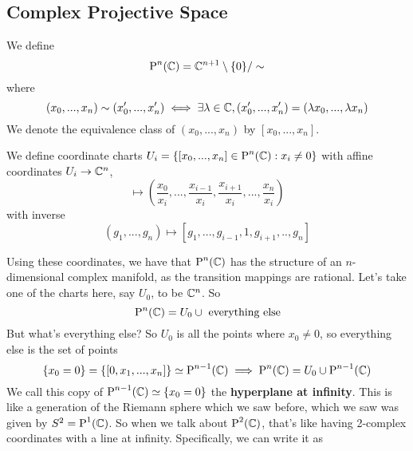 \documentclass{article}
\begin{document}
\subsection{Complex Projective Space}

\begin{definition}
We define
\begin{equation}
  \operatorname{P}^{n}({\mathbb{C}}) = \mathbb{C}^{n + 1} \setminus \{0\} / \sim
\end{equation}
where
\begin{equation}
  (x_0,...,x_n) \sim (x_0',...,x_n') \iff \exists \lambda \in \mathbb{C}, (x_0',...,x_n') = (\lambda x_0,..., \lambda x_n)
\end{equation}
We denote the equivalence class of \((x_0,...,x_n)\) by \([x_0,...,x_n]\).
\end{definition}
\begin{definition}
We define coordinate charts \(U_i = \{[x_0, ..., x_n] \in \operatorname{P}^{n}({\mathbb{C}}) : x_i \neq 0\}\) with affine coordinates \(U_i \to \mathbb{C}^n\),
\begin{equation}[x_0,...,x_n] \mapsto \left(\frac{x_0}{x_i},...,\frac{x_{i - 1}}{x_i}, \frac{x_{i + 1}}{x_i},...,\frac{x_n}{x_i}\right)\end{equation}
with inverse
\begin{equation}(g_1,...,g_n) \mapsto [g_1,...,g_{i - 1}, 1, g_{i + 1},..,g_n]\end{equation}
\end{definition}
Using these coordinates, we have that \(\operatorname{P}^{n}({\mathbb{C}})\) has the structure of an \(n\)-dimensional complex manifold, as the transition mappings are rational. Let's take one of the charts here, say \(U_0\), to be \(\mathbb{C}^n\). So
\begin{equation}\operatorname{P}^{n}({\mathbb{C}}) = U_0 \cup \ \text{everything else}\end{equation}
But what's everything else? So \(U_0\) is all the points where \(x_0 \neq 0\), so everything else is the set of points
\begin{equation}
  \{x_0 = 0\} = \{[0, x_1,...,x_n]\} \simeq \operatorname{P}^{n - 1}({\mathbb{C}})
  \implies \operatorname{P}^{n}({\mathbb{C}}) = U_0 \cup \operatorname{P}^{n - 1}({\mathbb{C}})
\end{equation}
We call this copy of \(\operatorname{P}^{n - 1}({\mathbb{C}}) \simeq \{x_0 = 0\}\) the \textbf{hyperplane at infinity}. This is like a generation of the Riemann sphere which we saw before, which we saw was given by \(S^2 = \operatorname{P}^{1}({\mathbb{C}})\). So when we talk about \(\operatorname{P}^{2}({\mathbb{C}})\), that's like having 2-complex coordinates with a line at infinity. Specifically, we can write it as
\end{document}
